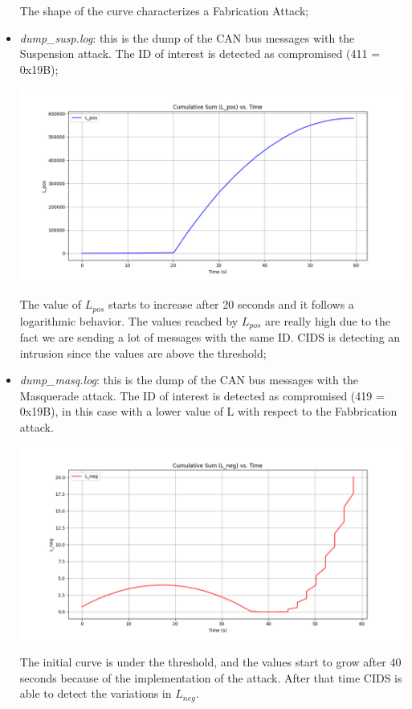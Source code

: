 \documentclass[12pt]{article}
\begin{document}
\begin{itemize}
    The shape of the curve characterizes a Fabrication Attack;
    \item \textit{dump\_susp.log}: this is the dump of the CAN bus messages with the Suspension 
    attack. The ID of interest is detected as compromised (411 = 0x19B);
    \begin{center}
        \vspace{-0.5cm}
        \hspace*{-2cm}
        \includegraphics[scale=0.5]{img/LposSusp.png}
    \end{center}
    The value of $L_{pos}$ starts to increase after 20 seconds and it follows a logarithmic behavior. The values
    reached by $L_{pos}$ are really high due to the fact we are sending a lot of messages with the same ID.
    CIDS is detecting an intrusion since the values are above the threshold;
    \item \textit{dump\_masq.log}: this is the dump of the CAN bus messages with the Masquerade attack. 
    The ID of interest is detected as compromised (419 = 0x19B), in this case with a lower value 
    of L with respect to the Fabbrication attack. 
    \begin{center}
        \vspace{-1cm}
        \hspace*{-2cm}
        \includegraphics[scale=0.5]{img/LnegMasq.png}
    \end{center}
    The initial curve is under the threshold, and the values start to grow after 40 seconds because of the implementation of the attack.
    After that time CIDS is able to detect the variations in $L_{neg}$.
\end{itemize}

\printbibliography 
\end{document}

